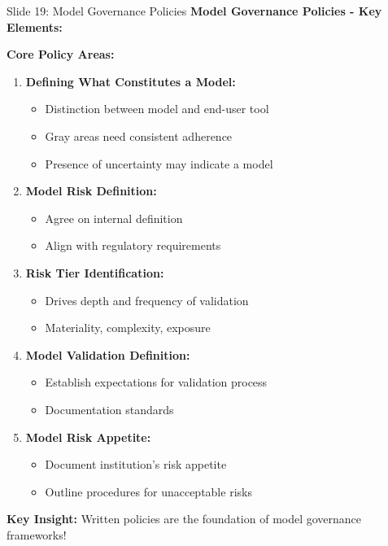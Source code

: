 \documentclass[8pt]{beamer}
\begin{document}
	\begin{frame}{Slide 19: Model Governance Policies}
		\fontsize{6.5}{7.5}\selectfont
		\textbf{Model Governance Policies - Key Elements:}
		
		\vspace{0.1cm}
		\textbf{Core Policy Areas:}
		\begin{enumerate}
			\item \textbf{Defining What Constitutes a Model:}
			\begin{itemize}
				\item Distinction between model and end-user tool
				\item Gray areas need consistent adherence
				\item Presence of uncertainty may indicate a model
			\end{itemize}
			\item \textbf{Model Risk Definition:}
			\begin{itemize}
				\item Agree on internal definition
				\item Align with regulatory requirements
			\end{itemize}
			\item \textbf{Risk Tier Identification:}
			\begin{itemize}
				\item Drives depth and frequency of validation
				\item Materiality, complexity, exposure
			\end{itemize}
			\item \textbf{Model Validation Definition:}
			\begin{itemize}
				\item Establish expectations for validation process
				\item Documentation standards
			\end{itemize}
			\item \textbf{Model Risk Appetite:}
			\begin{itemize}
				\item Document institution's risk appetite
				\item Outline procedures for unacceptable risks
			\end{itemize}
		\end{enumerate}
		
		\textcolor{myblue}{\textbf{Key Insight:}} Written policies are the \textcolor{myblue}{foundation of model governance frameworks}!
	\end{frame}
	
\end{document}
